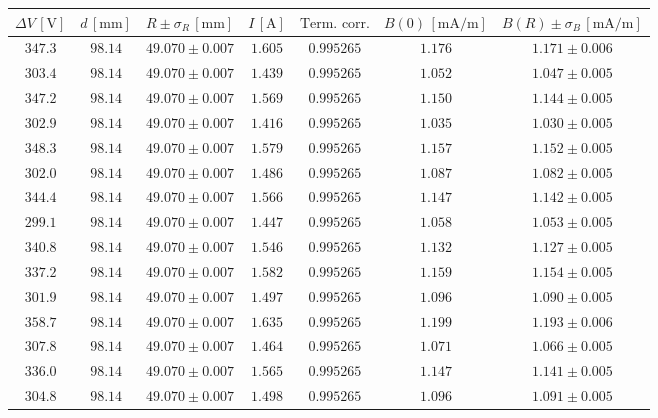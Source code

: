 \documentclass[]{article}
\begin{document}
\begin{table}[H]
    \centering

\begin{tabular}{||c|c|c|c|c|c|c||}
    \hline
    $\Delta V\, [\text{V}] $ & $d\, [\text{mm}] $ & $R \pm \sigma_R\, [\text{mm}] $ & $I\, [\text{A}] $ & $\text{Term. corr.}$ & $B(0)\, [\text{mA/m}] $ & $B(R) \pm \sigma_B\, [\text{mA/m}] $ \\
    \hline\hline

    $347.3$ & $98.14$ & $49.070 \pm 0.007$ & $1.605$ & $0.995265$ & $1.176$ & $1.171 \pm 0.006$ \\\hline
    $303.4$ & $98.14$ & $49.070 \pm 0.007$ & $1.439$ & $0.995265$ & $1.052$ & $1.047 \pm 0.005$ \\\hline
    $347.2$ & $98.14$ & $49.070 \pm 0.007$ & $1.569$ & $0.995265$ & $1.150$ & $1.144 \pm 0.005$ \\\hline
    $302.9$ & $98.14$ & $49.070 \pm 0.007$ & $1.416$ & $0.995265$ & $1.035$ & $1.030 \pm 0.005$ \\\hline
    $348.3$ & $98.14$ & $49.070 \pm 0.007$ & $1.579$ & $0.995265$ & $1.157$ & $1.152 \pm 0.005$ \\\hline
    $302.0$ & $98.14$ & $49.070 \pm 0.007$ & $1.486$ & $0.995265$ & $1.087$ & $1.082 \pm 0.005$ \\\hline
    $344.4$ & $98.14$ & $49.070 \pm 0.007$ & $1.566$ & $0.995265$ & $1.147$ & $1.142 \pm 0.005$ \\\hline
    $299.1$ & $98.14$ & $49.070 \pm 0.007$ & $1.447$ & $0.995265$ & $1.058$ & $1.053 \pm 0.005$ \\\hline
    $340.8$ & $98.14$ & $49.070 \pm 0.007$ & $1.546$ & $0.995265$ & $1.132$ & $1.127 \pm 0.005$ \\\hline
    $337.2$ & $98.14$ & $49.070 \pm 0.007$ & $1.582$ & $0.995265$ & $1.159$ & $1.154 \pm 0.005$ \\\hline
    $301.9$ & $98.14$ & $49.070 \pm 0.007$ & $1.497$ & $0.995265$ & $1.096$ & $1.090 \pm 0.005$ \\\hline
    $358.7$ & $98.14$ & $49.070 \pm 0.007$ & $1.635$ & $0.995265$ & $1.199$ & $1.193 \pm 0.006$ \\\hline
    $307.8$ & $98.14$ & $49.070 \pm 0.007$ & $1.464$ & $0.995265$ & $1.071$ & $1.066 \pm 0.005$ \\\hline
    $336.0$ & $98.14$ & $49.070 \pm 0.007$ & $1.565$ & $0.995265$ & $1.147$ & $1.141 \pm 0.005$ \\\hline
    $304.8$ & $98.14$ & $49.070 \pm 0.007$ & $1.498$ & $0.995265$ & $1.096$ & $1.091 \pm 0.005$ \\\hline

\end{tabular}
\end{table}
\end{document}
